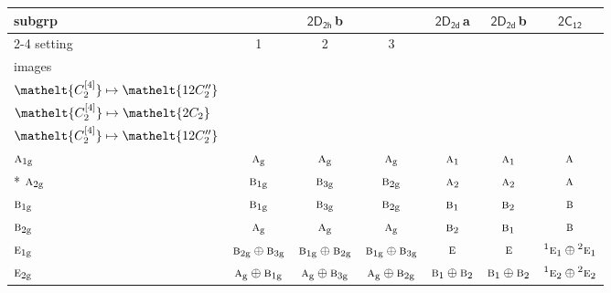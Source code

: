 \documentclass[10pt,a4paper]{article}
\numberwithin{equation}{section}
\newcommand{\eltfont}[1]{{\let\sigma\eltsigma\mathelt{#1}}}
\newcommand{\grp}[1]{\mathsf{#1}}
\newcommand{\irr}[1]{\text{\normalfont\scshape #1}}
\newcommand{\conjpair}[1]{{}^{#1}}
\newcommand{\cls}[1]{\eltfont{#1}}
\newcommand{\ptag}[1]{\mathrm{#1}}
\newcommand{\clsletter}[1]{\,{\scriptsize\color{black!55}#1}}
\newcommand{\genidx}[2]{#1^{[\mathrm{#2}]}}
\begin{document}
{\small\begin{longtable}{@{}lcccccc@{}}\toprule
subgrp & \multicolumn{3}{c}{\href{2D2h.pdf}{$\grp{2D_{2h}}$}\clsletter{b}} & \href{2D2d.pdf}{$\grp{2D_{2d}}$}\clsletter{a} & \href{2D2d.pdf}{$\grp{2D_{2d}}$}\clsletter{b} & \href{2C12.pdf}{$\grp{2C_{12}}$}\\\cmidrule(lr){2-4}
setting & 1 & 2 & 3 &  &  & \\
images & {\scriptsize\begin{tabular}[t]{@{}c@{}}$\cls{\genidx{C_{2}}{2}} \mapsto \cls{2C_{2}}$\\$\cls{\genidx{C_{2}}{4}} \mapsto \cls{12C_{2}''}$\end{tabular}} & {\scriptsize\begin{tabular}[t]{@{}c@{}}$\cls{\genidx{C_{2}}{2}} \mapsto \cls{12C_{2}''}$\\$\cls{\genidx{C_{2}}{4}} \mapsto \cls{2C_{2}}$\end{tabular}} & {\scriptsize\begin{tabular}[t]{@{}c@{}}$\cls{\genidx{C_{2}}{2}} \mapsto \cls{12C_{2}''}$\\$\cls{\genidx{C_{2}}{4}} \mapsto \cls{12C_{2}''}$\end{tabular}} &  &  & \\\midrule\endhead
\bottomrule\endfoot\endlastfoot
$\irr{a}_{1\ptag{g}}$ & $\irr{a}_{\ptag{g}}$ & $\irr{a}_{\ptag{g}}$ & $\irr{a}_{\ptag{g}}$ & $\irr{a}_{1}$ & $\irr{a}_{1}$ & $\irr{a}$\\*
$\irr{a}_{2\ptag{g}}$ & $\irr{b}_{1\ptag{g}}$ & $\irr{b}_{3\ptag{g}}$ & $\irr{b}_{2\ptag{g}}$ & $\irr{a}_{2}$ & $\irr{a}_{2}$ & $\irr{a}$\\
$\irr{b}_{1\ptag{g}}$ & $\irr{b}_{1\ptag{g}}$ & $\irr{b}_{3\ptag{g}}$ & $\irr{b}_{2\ptag{g}}$ & $\irr{b}_{1}$ & $\irr{b}_{2}$ & $\irr{b}$\\
$\irr{b}_{2\ptag{g}}$ & $\irr{a}_{\ptag{g}}$ & $\irr{a}_{\ptag{g}}$ & $\irr{a}_{\ptag{g}}$ & $\irr{b}_{2}$ & $\irr{b}_{1}$ & $\irr{b}$\\
$\irr{e}_{1\ptag{g}}$ & $\irr{b}_{2\ptag{g}}\oplus \irr{b}_{3\ptag{g}}$ & $\irr{b}_{1\ptag{g}}\oplus \irr{b}_{2\ptag{g}}$ & $\irr{b}_{1\ptag{g}}\oplus \irr{b}_{3\ptag{g}}$ & $\irr{e}$ & $\irr{e}$ & $\conjpair{1}\irr{e}_{1}\oplus \conjpair{2}\irr{e}_{1}$\\
$\irr{e}_{2\ptag{g}}$ & $\irr{a}_{\ptag{g}}\oplus \irr{b}_{1\ptag{g}}$ & $\irr{a}_{\ptag{g}}\oplus \irr{b}_{3\ptag{g}}$ & $\irr{a}_{\ptag{g}}\oplus \irr{b}_{2\ptag{g}}$ & $\irr{b}_{1}\oplus \irr{b}_{2}$ & $\irr{b}_{1}\oplus \irr{b}_{2}$ & $\conjpair{1}\irr{e}_{2}\oplus \conjpair{2}\irr{e}_{2}$\\

\end{longtable}}
\end{document}
